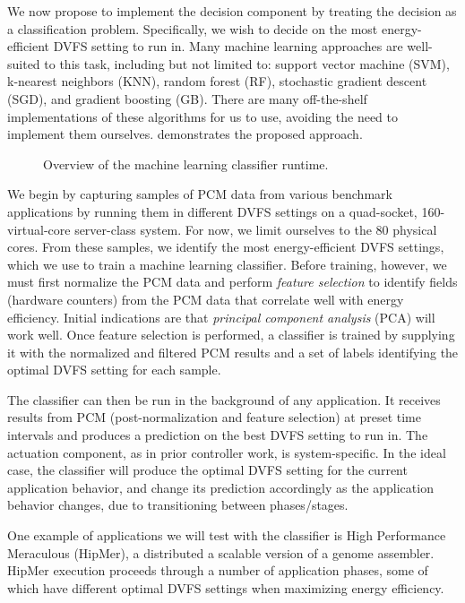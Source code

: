 We now propose to implement the decision component by treating the decision as a classification problem.
Specifically, we wish to decide on the most energy-efficient DVFS setting to run in.
Many machine learning approaches are well-suited to this task, including but not limited to: support vector machine (SVM), k-nearest neighbors (KNN), random forest (RF), stochastic gradient descent (SGD), and gradient boosting (GB).
There are many off-the-shelf implementations of these algorithms for us to use, avoiding the need to implement them ourselves.
 demonstrates the proposed approach.

\begin{figure}[t]
  \begin{centering}
    
    \caption{Overview of the machine learning classifier runtime.}
    \label{fig:classifier-runtime}
  \end{centering}
\end{figure}

We begin by capturing samples of PCM data from various benchmark applications by running them in different DVFS settings on a quad-socket, 160-virtual-core server-class system.
For now, we limit ourselves to the 80 physical cores.
From these samples, we identify the most energy-efficient DVFS settings, which we use to train a machine learning classifier.
Before training, however, we must first normalize the PCM data and perform \emph{feature selection} to identify fields (hardware counters) from the PCM data that correlate well with energy efficiency.
Initial indications are that \emph{principal component analysis} (PCA) will work well.
Once feature selection is performed, a classifier is trained by supplying it with the normalized and filtered PCM results and a set of labels identifying the optimal DVFS setting for each sample.

The classifier can then be run in the background of any application.
It receives results from PCM (post-normalization and feature selection) at preset time intervals and produces a prediction on the best DVFS setting to run in.
The actuation component, as in prior controller work, is system-specific.
In the ideal case, the classifier will produce the optimal DVFS setting for the current application behavior, and change its prediction accordingly as the application behavior changes, \eg due to transitioning between phases/stages.

One example of applications we will test with the classifier is High Performance Meraculous (HipMer), a distributed a scalable version of a genome assembler.
HipMer execution proceeds through a number of application phases, some of which have different optimal DVFS settings when maximizing energy efficiency.


